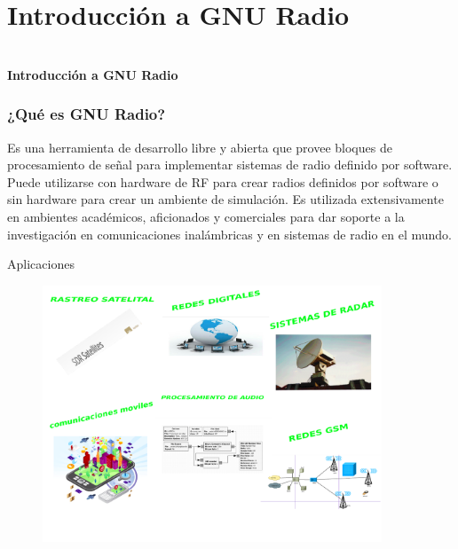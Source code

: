 \section{Introducción a GNU Radio}

\begin{frame}{}


\bfseries{\textrm{\Large \\Introducción a GNU Radio}}
\raggedright
\end{frame}



\begin{frame}
  
  
  \frametitle{¿Qué es GNU Radio?}

  
  Es una herramienta de desarrollo libre y abierta que provee bloques de procesamiento de señal para implementar sistemas de radio definido por software. Puede utilizarse con hardware de RF para crear radios definidos por
software o sin hardware para crear un ambiente de simulación. Es utilizada
extensivamente en ambientes académicos, aficionados y comerciales para dar
soporte a la investigación en comunicaciones inalámbricas y en sistemas de
radio en el mundo.
\end{frame}



\begin{frame}{Aplicaciones}
  \begin{figure}[H]
  \centering
  \includegraphics[width=0.9\textwidth]{intro/pdf/intro.pdf}
  \end{figure}
  
  
\end{frame}



